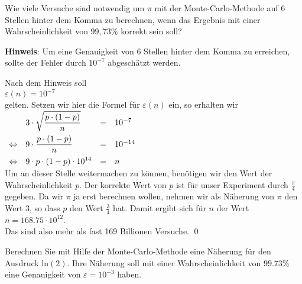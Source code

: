 \vspace*{0.3cm}

\exercise
Wie viele Versuche sind notwendig um $\pi$ mit der Monte-Carlo-Methode auf 6
Stellen hinter dem Komma zu berechnen, wenn das Ergebnis mit einer Wahr\-scheinlichkeit von $99,73\%$
korrekt sein soll?
\vspace*{0.1cm}

\noindent
\textbf{Hinweis}: 
Um eine Genauigkeit von 6 Stellen hinter dem Komma zu erreichen, sollte der Fehler durch $10^{-7}$
abgesch\"atzt werden.  \eox


\solution
Nach dem Hinweis soll 
\\[0.2cm]
\hspace*{1.3cm}
$\varepsilon(n) = 10^{-7}$
\\[0.2cm]
gelten. Setzen wir hier die Formel f\"ur $\varepsilon(n)$ ein, so erhalten wir
\\[0.2cm]
\hspace*{1.3cm}
$  
\begin{array}[t]{llcl}
                & \displaystyle 3 \cdot \sqrt{\frac{p \cdot (1 - p)}{n}} & = & 10^{-7}   \\[0.3cm]
\Leftrightarrow & \displaystyle 9 \cdot        \frac{p \cdot (1 - p)}{n} & = & 10^{-14}      \\[0.3cm]
\Leftrightarrow & \displaystyle 9 \cdot    p \cdot (1 - p) \cdot 10^{14} & = & n 
\end{array}
$
\\[0.2cm] 
Um an dieser Stelle weitermachen zu k\"onnen, ben\"otigen wir den Wert der Wahr\-scheinlichkeit $p$.  Der korrekte
Wert von $p$ ist f\"ur unser Experiment durch $\frac{\pi}{4}$ gegeben.  Da wir $\pi$ ja erst berechnen wollen,
nehmen wir als N\"aherung von $\pi$ den Wert $3$, so dass $p$ den Wert $\frac{3}{4}$ hat.  Damit
ergibt sich f\"ur $n$ der Wert
\\[0.2cm]
\hspace*{1.3cm}
$n = 168.75 \cdot 10^{12}$.
\\[0.2cm]
Das sind also mehr als fast 169 Billionen Versuche. \qed


\exercise
Berechnen Sie mit Hilfe der Monte-Carlo-Methode eine N\"aherung f\"ur den Ausdruck $\mathrm{ln}(2)$.
Ihre N\"aherung soll mit einer Wahrscheinlichkeit von $99.73\%$ eine Genauigkeit von 
$\varepsilon = 10^{-3}$ haben. \eox
\pagebreak


